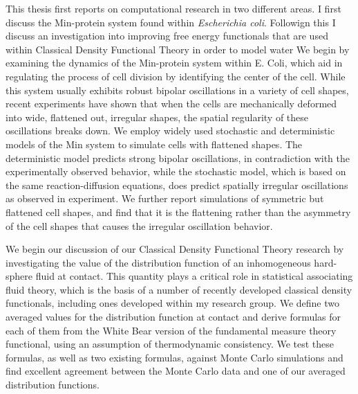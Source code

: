 

 This thesis first reports on computational
research in two different areas.  I first discuss the Min-protein
system found within \emph{Escherichia coli}.  Followign this I discuss
an investigation into improving free energy functionals that are used
within Classical Density Functional Theory in order to model water
%
We begin by examining the dynamics of the Min-protein system within
E. Coli, which aid in regulating the process of cell division by
identifying the center of the cell.  While this system usually
exhibits robust bipolar oscillations in a variety of cell shapes,
recent experiments have shown that when the cells are mechanically
deformed into wide, flattened out, irregular shapes, the spatial
regularity of these oscillations breaks down. We employ widely used
stochastic and deterministic models of the Min system to simulate
cells with flattened shapes.  The deterministic model predicts strong
bipolar oscillations, in contradiction with the experimentally
observed behavior, while the stochastic model, which is based on the
same reaction-diffusion equations, does predict spatially irregular
oscillations as observed in experiment.  We further report simulations
of symmetric but flattened cell shapes, and find that it is the
flattening rather than the asymmetry of the cell shapes that causes
the irregular oscillation behavior.
%

We begin our discussion of our Classical Density Functional Theory
research by investigating the value of the distribution function of an
inhomogeneous hard-sphere fluid at contact. This quantity plays a
critical role in statistical associating fluid theory, which is the
basis of a number of recently developed classical density functionals,
including ones developed within my research group. We define two
averaged values for the distribution function at contact and derive
formulas for each of them from the White Bear version of the
fundamental measure theory functional, using an assumption of
thermodynamic consistency. We test these formulas, as well as two
existing formulas, against Monte Carlo simulations and find excellent
agreement between the Monte Carlo data and one of our averaged
distribution functions.
%

